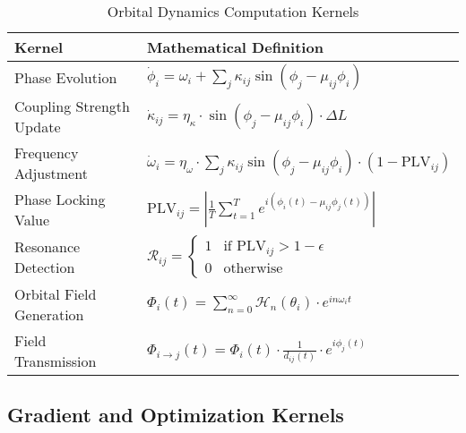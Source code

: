 \begin{table}[h]
\centering
\small
\caption{Orbital Dynamics Computation Kernels}
\label{tab:orbital_kernels}
\begin{tabular}{|p{5cm}|p{9cm}|}
\hline
\textbf{Kernel} & \textbf{Mathematical Definition} \\
\hline
Phase Evolution & $\dot{\phi}_i = \omega_i + \sum_j \kappa_{ij} \sin(\phi_j - \mu_{ij}\phi_i)$ \\
\hline
Coupling Strength Update & $\dot{\kappa}_{ij} = \eta_{\kappa} \cdot \sin(\phi_j - \mu_{ij}\phi_i) \cdot \Delta L$ \\
\hline
Frequency Adjustment & $\dot{\omega}_i = \eta_{\omega} \cdot \sum_j \kappa_{ij} \sin(\phi_j - \mu_{ij}\phi_i) \cdot (1 - \text{PLV}_{ij})$ \\
\hline
Phase Locking Value & $\text{PLV}_{ij} = \left| \frac{1}{T} \sum_{t=1}^T e^{i(\phi_i(t) - \mu_{ij}\phi_j(t))} \right|$ \\
\hline
Resonance Detection & $\mathcal{R}_{ij} = \begin{cases} 1 & \text{if } \text{PLV}_{ij} > 1-\epsilon \\ 0 & \text{otherwise} \end{cases}$ \\
\hline
Orbital Field Generation & $\Phi_i(t) = \sum_{n=0}^{\infty} \mathcal{H}_n(\theta_i) \cdot e^{in\omega_i t}$ \\
\hline
Field Transmission & $\Phi_{i \rightarrow j}(t) = \Phi_i(t) \cdot \frac{1}{d_{ij}(t)} \cdot e^{i\phi_j(t)}$ \\
\hline
\end{tabular}
\end{table}

\subsection{Gradient and Optimization Kernels}

